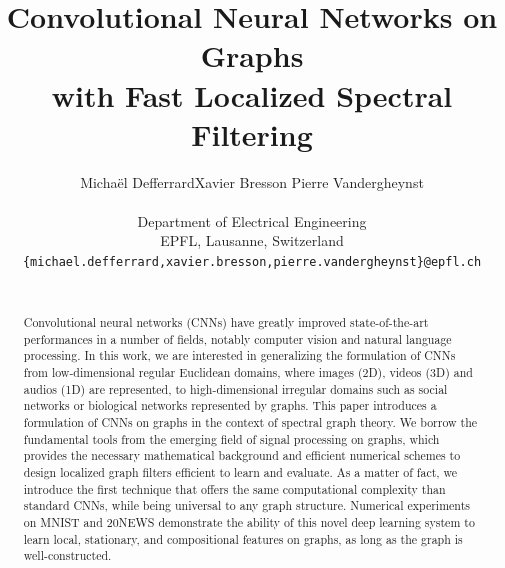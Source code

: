 \documentclass{article}
\title{Convolutional Neural Networks on Graphs\\
with Fast Localized Spectral Filtering\\}
\author{
  Micha\"{e}l Defferrard\hspace{1cm}Xavier Bresson\hspace{1cm} Pierre Vandergheynst\\ \\
  Department of Electrical Engineering \\
  EPFL, Lausanne, Switzerland \\
  {\small \texttt{\{michael.defferrard,xavier.bresson,pierre.vandergheynst\}@epfl.ch} } \\\\
}
\begin{document}
\maketitle



\begin{abstract}


	Convolutional neural networks (CNNs) have greatly improved state-of-the-art
	performances in a number of fields, notably computer vision and natural
	language processing. In this work, we are interested in generalizing the
	formulation of CNNs from low-dimensional regular Euclidean domains, where
	images (2D), videos (3D) and audios (1D) are represented, to high-dimensional
	irregular domains such as social networks or biological networks represented by graphs. This paper introduces a formulation
	of CNNs on graphs in the context of spectral graph theory. We borrow the
	fundamental tools from the emerging field of signal processing on graphs,
	which provides the necessary mathematical background and efficient numerical
	schemes to design localized graph filters efficient to learn and evaluate. 
	As a matter of fact, we introduce the first technique that offers the same computational complexity than standard CNNs, while being universal to any graph structure. 
	Numerical experiments on MNIST and 20NEWS demonstrate the ability of this novel deep learning system to learn local, stationary, and compositional features on graphs, as long as the graph
	is well-constructed. %
	
	
	 



	
\end{abstract}
\end{document}
